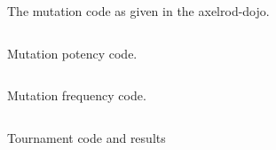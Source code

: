 \begin{appendices}
    \begin{figure}
        \inputminted{python}{code_snippets/mutateFromDojo.py}
        \caption{The mutation code as given in the axelrod-dojo.}
        \label{apcode:mutateFromDojo}
    \end{figure}
    
    \begin{figure}
        \inputminted{python}{code_snippets/mutationPotencyChecker.py}
        \caption{Mutation potency code.}\label{apcode:mutationPotencyChecker.py}
    \end{figure}

    \begin{figure}
        \inputminted{python}{code_snippets/mutationFrequencyChecker.py}
        \caption{Mutation frequency code.}\label{apcode:mutationFrequencyChecker.py}
    \end{figure}

    \begin{figure}
        \inputminted{python}{code_snippets/tournCode.py}
        \caption{Tournament code and results}\label{apcode:tournCode.py}
    \end{figure}


\end{appendices}
